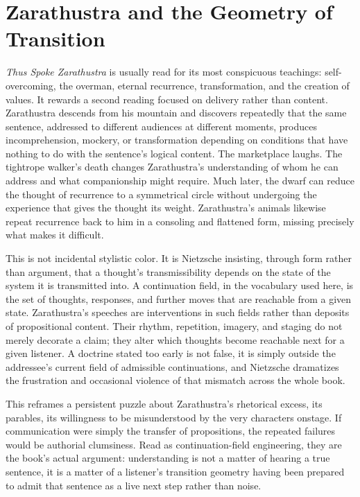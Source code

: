 \documentclass[11pt]{article}
\begin{document}
\section*{Zarathustra and the Geometry of Transition}

\emph{Thus Spoke Zarathustra} is usually read for its most conspicuous teachings: self-overcoming, the overman, eternal recurrence, transformation, and the creation of values. It rewards a second reading focused on delivery rather than content. Zarathustra descends from his mountain and discovers repeatedly that the same sentence, addressed to different audiences at different moments, produces incomprehension, mockery, or transformation depending on conditions that have nothing to do with the sentence's logical content. The marketplace laughs. The tightrope walker's death changes Zarathustra's understanding of whom he can address and what companionship might require. Much later, the dwarf can reduce the thought of recurrence to a symmetrical circle without undergoing the experience that gives the thought its weight. Zarathustra's animals likewise repeat recurrence back to him in a consoling and flattened form, missing precisely what makes it difficult.

This is not incidental stylistic color. It is Nietzsche insisting, through form rather than argument, that a thought's transmissibility depends on the state of the system it is transmitted into. A continuation field, in the vocabulary used here, is the set of thoughts, responses, and further moves that are reachable from a given state. Zarathustra's speeches are interventions in such fields rather than deposits of propositional content. Their rhythm, repetition, imagery, and staging do not merely decorate a claim; they alter which thoughts become reachable next for a given listener. A doctrine stated too early is not false, it is simply outside the addressee's current field of admissible continuations, and Nietzsche dramatizes the frustration and occasional violence of that mismatch across the whole book.

This reframes a persistent puzzle about Zarathustra's rhetorical excess, its parables, its willingness to be misunderstood by the very characters onstage. If communication were simply the transfer of propositions, the repeated failures would be authorial clumsiness. Read as continuation-field engineering, they are the book's actual argument: understanding is not a matter of hearing a true sentence, it is a matter of a listener's transition geometry having been prepared to admit that sentence as a live next step rather than noise.
\end{document}
